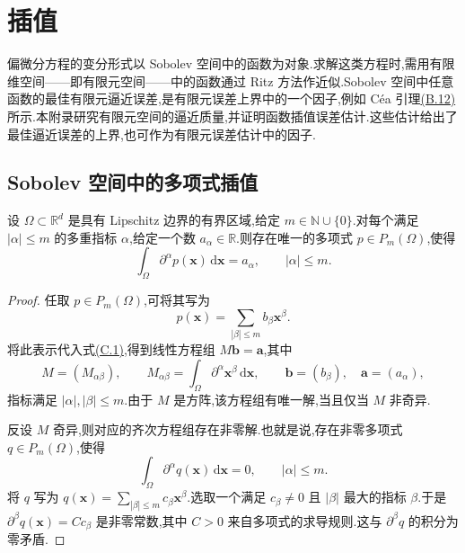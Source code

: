 \chapter{插值}\label{chap:appendix-c}

\begin{note}[动机]\label{note:appendix-c-1}
偏微分方程的变分形式以 Sobolev 空间中的函数为对象.求解这类方程时,需用有限维空间——即有限元空间——中的函数通过 Ritz 方法作近似.Sobolev 空间中任意函数的最佳有限元逼近误差,是有限元误差上界中的一个因子,例如 Céa 引理\hyperref[lem:cea]{(B.12)} 所示.本附录研究有限元空间的逼近质量,并证明函数插值误差估计.这些估计给出了最佳逼近误差的上界,也可作为有限元误差估计中的因子.
\end{note}

\section{Sobolev 空间中的多项式插值}\label{sec:appendix-c-1}

\begin{lemma}[积分条件唯一确定多项式]\label{lem:appendix-c-2}
设 $\Omega\subset\mathbb R^d$ 是具有 Lipschitz 边界的有界区域,给定
$m\in\mathbb N\cup\{0\}$.对每个满足 $|\alpha|\le m$ 的多重指标 $\alpha$,给定一个数 $a_\alpha\in\mathbb R$.则存在唯一的多项式 $p\in P_m(\Omega)$,使得
\begin{equation}\label{eq:appendix-c-1}
 \int_\Omega \partial^\alpha p(\bm x)\,\mathrm d\bm x
 =a_\alpha,\qquad |\alpha|\le m.
\end{equation}
\end{lemma}

\begin{proof}
任取 $p\in P_m(\Omega)$,可将其写为
\[
 p(\bm x)=\sum_{|\beta|\le m}b_\beta\bm x^\beta.
\]
将此表示代入式\hyperref[eq:appendix-c-1]{(C.1)},得到线性方程组
$M\bm b=\bm a$,其中
\[
 M=(M_{\alpha\beta}),\qquad
 M_{\alpha\beta}=\int_\Omega\partial^\alpha\bm x^\beta\,\mathrm d\bm x,
 \qquad \bm b=(b_\beta),\quad \bm a=(a_\alpha),
\]
指标满足 $|\alpha|,|\beta|\le m$.由于 $M$ 是方阵,该方程组有唯一解,当且仅当 $M$ 非奇异.

反设 $M$ 奇异,则对应的齐次方程组存在非零解.也就是说,存在非零多项式 $q\in P_m(\Omega)$,使得
\[
 \int_\Omega\partial^\alpha q(\bm x)\,\mathrm d\bm x=0,
 \qquad |\alpha|\le m.
\]
将 $q$ 写为 $q(\bm x)=\sum_{|\beta|\le m}c_\beta\bm x^\beta$.选取一个满足 $c_\beta\ne0$ 且 $|\beta|$ 最大的指标 $\beta$.于是
$\partial^\beta q(\bm x)=C c_\beta$ 是非零常数,其中 $C>0$ 来自多项式的求导规则.这与 $\partial^\beta q$ 的积分为零矛盾.
\end{proof}

